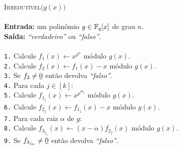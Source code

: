 \noindent\\
\vspace{\baselineskip}\\
\hspace{.5in}\hrulefill\\
\hspace{.5in}\textsc{Irredutível}$\bigl(g(x)\bigr)$\\
\hspace{.5in}\hrulefill\\
\hspace{.5in}\textbf{Entrada:} um polinômio $g\in\mathbb{F}_{q}[x]$ de grau
$n$.\\
\hspace{.5in}\textbf{Saída:} \textsl{``verdadeiro''} ou
\textsl{``falso''}.\\
\hspace{.5in}\hrulefill\\
\hspace{.5in}\texttt{1.}
\hspace{.5in} Calcule $f_1(x)\leftarrow x^{p^n}$ módulo
$g(x)$.\\
\hspace{.5in}\texttt{2.}
\hspace{.5in} Calcule $f_2(x)\leftarrow f_1(x)-x$ módulo
$g(x)$.\\
\hspace{.5in}\texttt{3.}
\hspace{.5in} Se $f_2\neq\underline{0}$ então devolva
\textsl{``falso''}.\\
\hspace{.5in}\texttt{4.}
\hspace{.5in} Para cada $j\in[k]$:\\
\hspace{.5in}\texttt{5.}
\hspace{1in} Calcule $f_{1_j}(x)\leftarrow x^{p^{m_j}}$
módulo $g(x)$.\\
\hspace{.5in}\texttt{6.}
\hspace{1in} Calcule $f_{2_j}(x)\leftarrow f_{1_j}(x)-x$
módulo $g(x)$.\\
\hspace{.5in}\texttt{7.}
\hspace{1in} Para cada raiz $\alpha$ de $g$:\\
\hspace{.5in}\texttt{8.}
\hspace{1.5in} Calcule $f_{3_{j_{\alpha}}}(x)\leftarrow
  (x-\alpha)f_{2_j}(x)$ módulo $g(x)$.\\
\hspace{.5in}\texttt{9.}
\hspace{1.5in} Se $f_{3_{j_{\alpha}}}\neq\underline{0}$ então devolva
\textsl{``falso''}.\\
\hspace{.5in}\hrulefill\\
\vspace{\baselineskip}

